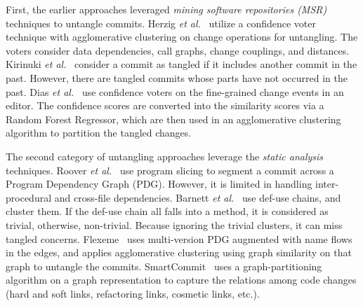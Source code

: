First, the earlier approaches leveraged {\em mining software repositories
  (MSR)} techniques to untangle commits. Herzig {\em et
  al.}~\cite{kim-msr13,kim-emse16} utilize a confidence voter
technique with agglomerative clustering on change
operations for untangling.
The voters consider data dependencies, call graphs, change
couplings, and distances.
%
Kirinuki {\em et al.}~\cite{higo-apsec16, higo-icpc14} consider a
commit as tangled if it includes another commit in the past. However,
there are tangled commits whose parts have not occurred
in the past.
%
Dias {\em et al.}~\cite{dias-saner15} use confidence voters on the
fine-grained change events in an editor. The confidence scores are
converted into the similarity scores via a Random Forest Regressor,
which are then used in an agglomerative clustering algorithm to partition
the tangled changes.

The second category of untangling approaches leverage the {\em static
analysis} techniques. Roover {\em et
  al.}~\cite{roover-scam18} use program slicing to segment a commit
across a Program Dependency Graph (PDG).  However, it is limited in
handling inter-procedural and cross-file dependencies. Barnett {\em et
  al.}~\cite{barnett-icse15} use def-use chains, and cluster them. If
the def-use chain all falls into a method, it is considered as
trivial, otherwise, non-trivial. Because ignoring the trivial
clusters, it can miss tangled concerns. Flexeme~\cite{flexeme-fse20}
uses multi-version PDG augmented with name flows in the edges, and
applies agglomerative clustering using graph similarity on that graph
to untangle the commits. SmartCommit~\cite{smartcommit-fse21} uses a
graph-partitioning algorithm on a graph representation to capture the
relations among code changes (hard and soft links, refactoring links,
cosmetic links, etc.).


